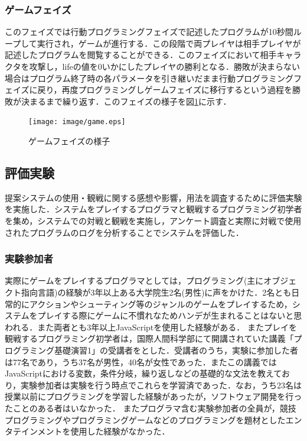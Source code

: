 \subsubsection{ゲームフェイズ}
このフェイズでは行動プログラミングフェイズで記述したプログラムが10秒間ループして実行され，ゲームが進行する．この段階で両プレイヤは相手プレイヤが記述したプログラムを閲覧することができる．このフェイズにおいて相手キャラクタを攻撃し，lifeの値を0いかにしたプレイヤの勝利となる．勝敗が決まらない場合はプログラム終了時の各パラメータを引き継いだまま行動プログラミングフェイズに戻り，再度プログラミングしゲームフェイズに移行するという過程を勝敗が決まるまで繰り返す．このフェイズの様子を図\ref{game}に示す．

\begin{figure}[!h]
  \begin{center}
    \texttt{[image: image/game.eps]}
  \end{center}
    \vspace{-8mm} 
  \caption{ゲームフェイズの様子}
  \label{game}
\end{figure}

\subsection{評価実験}
提案システムの使用・観戦に関する感想や影響，用法を調査するために評価実験を実施した．システムをプレイするプログラマと観戦するプログラミング初学者を集め，システムでの対戦と観戦を実施し，アンケート調査と実際に対戦で使用されたプログラムのログを分析することでシステムを評価した．

\subsubsection{実験参加者}
実際にゲームをプレイするプログラマとしては，プログラミング(主にオブジェクト指向言語)の経験が3年以上ある大学院生2名(男性)に声をかけた．2名とも日常的にアクションやシューティング等のジャンルのゲームをプレイするため，システムをプレイする際にゲームに不慣れなためハンデが生まれることはないと思われる．また両者とも3年以上JavaScriptを使用した経験がある．
またプレイを観戦するプログラミング初学者は，国際人間科学部にて開講されていた講義「プログラミング基礎演習1」の受講者をとした．受講者のうち，実験に参加した者は77名であり，うち37名が男性，40名が女性であった．またこの講義ではJavaScriptにおける変数，条件分岐，繰り返しなどの基礎的な文法を教えており，実験参加者は実験を行う時点でこれらを学習済であった．なお，うち23名は授業以前にプログラミングを学習した経験があったが，ソフトウェア開発を行ったことのある者はいなかった．
またプログラマ含む実験参加者の全員が，競技プログラミングやプログラミングゲームなどのプログラミングを題材としたエンタテインメントを使用した経験がなかった．

